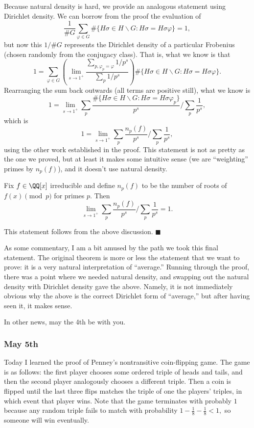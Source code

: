 Because natural density is hard, we provide an analogous statement using Dirichlet density. We can borrow from the proof the evaluation of
\[\frac1{\#G}\sum_{\varphi\in G}\#\{H\sigma\in H\backslash G:H\sigma=H\sigma\varphi\}=1,\]
but now this $1/\#G$ represents the Dirichlet density of a particular Frobenius (chosen randomly from the conjugacy class). That is, what we know is that
\[1=\sum_{\varphi\in G}\left(\lim_{s\to1^+}\frac{\sum_{p,\varphi_p=\varphi}1/p^s}{\sum_p1/p^s}\right)\#\{H\sigma\in H\backslash G:H\sigma=H\sigma\varphi\}.\]
Rearranging the sum back outwards (all terms are positive still), what we know is
\[1=\lim_{s\to1^+}\sum_p\frac{\#\{H\sigma\in H\backslash G:H\sigma=H\sigma\varphi_p\}}{p^s}\bigg/\sum_p\frac1{p^s},\]
which is
\[1=\lim_{s\to1^+}\sum_p\frac{n_p(f)}{p^s}\bigg/\sum_p\frac1{p^s},\]
using the other work established in the proof. This statement is not as pretty as the one we proved, but at least it makes some intuitive sense (we are ``weighting'' primes by $n_p(f)$), and it doesn't use natural density.
\begin{theorem}
    Fix $f\in\QQ[x]$ irreducible and define $n_p(f)$ to be the number of roots of $f(x)\pmod p$ for primes $p.$ Then
    \[\lim_{s\to1^+}\sum_p\frac{n_p(f)}{p^s}\bigg/\sum_p\frac1{p^s}=1.\]
\end{theorem}
This statement follows from the above discussion. $\blacksquare$

As some commentary, I am a bit amused by the path we took this final statement. The original theorem is more or less the statement that we want to prove: it is a very natural interpretation of ``average.'' Running through the proof, there was a point where we needed natural density, and swapping out the natural density with Dirichlet density gave the above. Namely, it is not immediately obvious why the above is the correct Dirichlet form of ``average,'' but after having seen it, it makes sense.

In other news, may the 4th be with you.

\subsubsection{May 5th}
Today I learned the proof of Penney's nontransitive coin-flipping game. The game is as follows: the first player chooses some ordered triple of heads and tails, and then the second player analogously chooses a different triple. Then a coin is flipped until the last three flips matches the triple of one the players' triples, in which event that player wins. Note that the game terminates with probably $1$ because any random triple fails to match with probability $1-\frac18-\frac18<1,$ so someone will win eventually.

